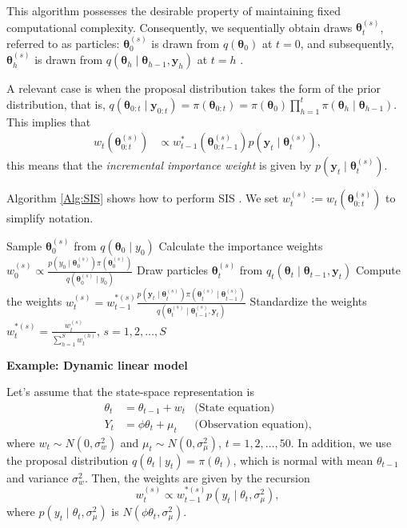This algorithm possesses the desirable property of maintaining fixed computational complexity. Consequently, we sequentially obtain draws $\bm{\theta}_t^{(s)}$, referred to as particles: $\bm{\theta}_0^{(s)}$ is drawn from $q(\bm{\theta}_0)$ at $t=0$, and subsequently, $\bm{\theta}_h^{(s)}$ is drawn from $q(\bm{\theta}_h\mid \bm{\theta}_{h-1},\bm{y}_{h})$ at $t=h$ \cite{doucet2001introduction,cappe2007overview}.

A relevant case is when the proposal distribution takes the form of the prior distribution, that is, $q(\bm{\theta}_{0:t}\mid \bm{y}_{0:t}) = \pi(\bm{\theta}_{0:t}) = \pi(\bm{\theta}_0)\prod_{h=1}^{t}\pi(\bm{\theta}_h\mid \bm{\theta}_{h-1})$. This implies that
\begin{align*}
	w_{t}(\bm{\theta}^{(s)}_{0:t})&\propto w_{t-1}^*(\bm{\theta}^{(s)}_{0:t-1})p(\bm{y}_{t}\mid \bm{\theta}_{t}^{(s)}),
\end{align*}
this means that the \textit{incremental importance weight} is given by $p(\bm{y}_{t}\mid \bm{\theta}_{t}^{(s)})$. 

Algorithm \ref{Alg:SIS} shows how to perform SIS \cite{cappe2007overview}. We set $w_t^{(s)}:=w_t(\bm{\theta}_{0:t}^{(s)})$ to simplify notation.\\
\begin{algorithm}[h!]
	\caption{Sequential importance sampling algorithm}\label{Alg:SIS}
	\begin{algorithmic}[1]
		\State Sample $\bm{\theta}_0^{(s)}$ from $q(\bm{\theta}_0\mid y_0)$
		\State Calculate the importance weights $w_0^{(s)}\propto\frac{p(y_0\mid \bm{\theta}_0^{(s)})\pi(\bm{\theta}_0^{(s)})}{q(\bm{\theta}_0^{(s)}\mid y_0)}$ 
		\EndFor 
				\State Draw particles $\bm{\theta}_t^{(s)}$ from $q_t(\bm{\theta}_t\mid \bm{\theta}_{t-1}, \bm{y}_t)$
				\State Compute the weights $w_t^{(s)}=w_{t-1}^{*(s)}\frac{p(\bm{y}_{t}\mid \bm{\theta}_{t}^{(s)})\pi(\bm{\theta}_{t}^{(s)}\mid \bm{\theta}_{t-1}^{(s)})}{q(\bm{\theta}_t^{(s)}\mid \bm{\theta}_{t-1}^{(s)},\bm{y}_{t})}$
			\EndFor
			\State Standardize the weights $w_t^{*(s)}=\frac{w_t^{(s)}}{\sum_{h=1}^Sw_t^{(h)}}$, $s=1,2,\dots,S$  
		\EndFor
	\end{algorithmic} 
\end{algorithm}

\textbf{Example: Dynamic linear model}

Let's assume that the state-space representation is  
\begin{align*}
	{\theta}_t &= {\theta}_{t-1} + {w}_t & \text{(State equation)} \nonumber\\
	Y_t & = \phi {\theta}_t + \mu_t & \text{(Observation equation)},
\end{align*}
where ${w}_t\sim N(0, \sigma_w^2)$ and $\mu_t\sim N(0,\sigma_{\mu}^2)$, $t=1,2,\dots,50$. In addition, we use the proposal distribution $q(\theta_t\mid y_t)=\pi(\theta_t)$, which is normal with mean $\theta_{t-1}$ and variance $\sigma_w^2$. Then, the weights are given by the recursion  
\[ 
w_t^{(s)} \propto w_{t-1}^{*(s)} p(y_t\mid \theta_t,\sigma_{\mu}^2), 
\]  
where $p(y_t\mid \theta_t,\sigma_{\mu}^2)$ is $N(\phi \theta_t, \sigma_{\mu}^2)$.  

